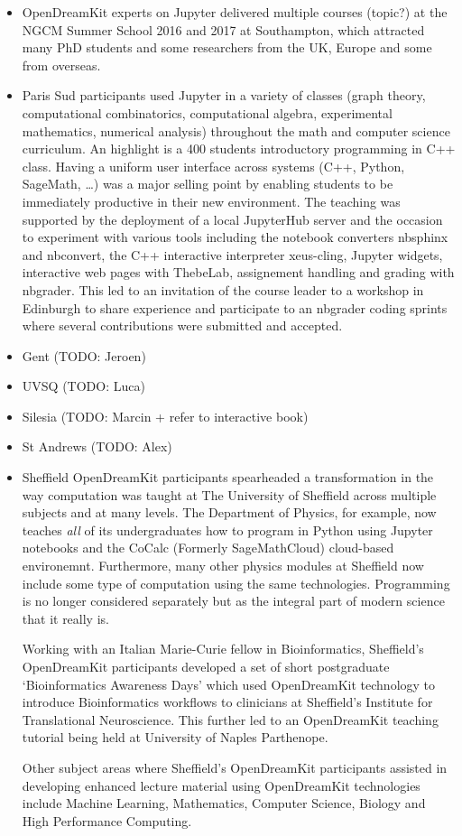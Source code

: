 \documentclass{deliverablereport}
\begin{document}
\begin{itemize}
\item
  OpenDreamKit experts on Jupyter delivered multiple courses (topic?) at
  the NGCM Summer School 2016 and 2017 at Southampton, which attracted
  many PhD students and some researchers from the UK, Europe and some
  from overseas.
\item
  Paris Sud participants used Jupyter in a variety of classes (graph
  theory, computational combinatorics, computational algebra,
  experimental mathematics, numerical analysis) throughout the math and
  computer science curriculum. An highlight is a 400 students
  introductory programming in C++ class. Having a uniform user interface
  across systems (C++, Python, SageMath, \ldots) was a major selling
  point by enabling students to be immediately productive in their new
  environment. The teaching was supported by the deployment of a local
  JupyterHub server and the occasion to experiment with various tools
  including the notebook converters nbsphinx and nbconvert, the C++
  interactive interpreter xeus-cling, Jupyter widgets, interactive web
  pages with ThebeLab, assignement handling and grading with nbgrader.
  This led to an invitation of the course leader to a workshop in
  Edinburgh to share experience and participate to an nbgrader coding
  sprints where several contributions were submitted and accepted.
\item
  Gent (TODO: Jeroen)
\item
  UVSQ (TODO: Luca)
\item
  Silesia (TODO: Marcin + refer to interactive book)
\item
  St Andrews (TODO: Alex)
\item
  Sheffield OpenDreamKit participants spearheaded a transformation in
  the way computation was taught at The University of Sheffield across
  multiple subjects and at many levels. The Department of Physics, for
  example, now teaches \emph{all} of its undergraduates how to program
  in Python using Jupyter notebooks and the CoCalc (Formerly
  SageMathCloud) cloud-based environemnt. Furthermore, many other
  physics modules at Sheffield now include some type of computation
  using the same technologies. Programming is no longer considered
  separately but as the integral part of modern science that it really
  is.

  Working with an Italian Marie-Curie fellow in Bioinformatics,
  Sheffield's OpenDreamKit participants developed a set of short
  postgraduate `Bioinformatics Awareness Days' which used OpenDreamKit
  technology to introduce Bioinformatics workflows to clinicians at
  Sheffield's Institute for Translational Neuroscience. This further led
  to an OpenDreamKit teaching tutorial being held at University of
  Naples Parthenope.

  Other subject areas where Sheffield's OpenDreamKit participants
  assisted in developing enhanced lecture material using OpenDreamKit
  technologies include Machine Learning, Mathematics, Computer Science,
  Biology and High Performance Computing.
\end{itemize}
\end{document}
